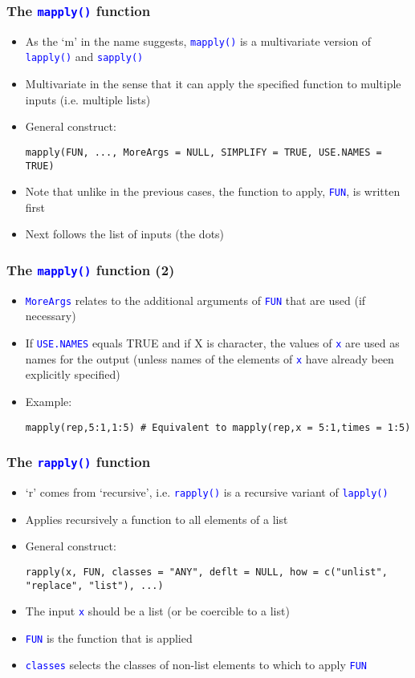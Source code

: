 \documentclass[10pt]{beamer}
\newcommand{\cc}[1]{\texttt{\textcolor{blue}{#1}}}
\theoremstyle{definition}
\begin{document}
\begin{frame}[fragile]
\frametitle{The \cc{mapply()} function}
\begin{itemize}
	\item As the `m' in the name suggests, \cc{mapply()} is a multivariate version of \cc{lapply()} and \cc{sapply()}
	\item Multivariate in the sense that it can apply the specified function to multiple inputs (i.e. multiple lists)
	\item General construct:
	\begin{lstlisting}[style = rstyle, breaklines]
	mapply(FUN, ..., MoreArgs = NULL, SIMPLIFY = TRUE, USE.NAMES = TRUE)
	\end{lstlisting}
	\item Note that unlike in the previous cases, the function to apply, \cc{FUN}, is written first
	\item Next follows the list of inputs (the dots)
\end{itemize}
\end{frame}

\begin{frame}[fragile]
\frametitle{The \cc{mapply()} function (2)}
\begin{itemize}
	\item \cc{MoreArgs} relates to the additional arguments of \cc{FUN} that are used (if necessary)
	\item If \cc{USE.NAMES} equals TRUE and if X is character, the values of \cc{x} are used as names for the output (unless names of the elements of \cc{x} have already been explicitly specified)
	\item Example:
	\begin{lstlisting}[style = rstyle, breaklines]
	mapply(rep,5:1,1:5) # Equivalent to mapply(rep,x = 5:1,times = 1:5)
	\end{lstlisting}
\end{itemize}
\end{frame}

\begin{frame}[fragile]
\frametitle{The \cc{rapply()} function}
\begin{itemize}
	\item `r' comes from `recursive', i.e. \cc{rapply()} is a recursive variant of \cc{lapply()}
	\item Applies recursively a function to all elements of a list
	\item General construct:
	\begin{lstlisting}[style = rstyle, breaklines]
	rapply(x, FUN, classes = "ANY", deflt = NULL, how = c("unlist", "replace", "list"), ...)
	\end{lstlisting}
	\item The input \cc{x} should be a list (or be coercible to a list)
	\item \cc{FUN} is the function that is applied
	\item \cc{classes} selects the classes of non-list elements to which to apply \cc{FUN}
\end{itemize}
\end{frame}
\end{document}
